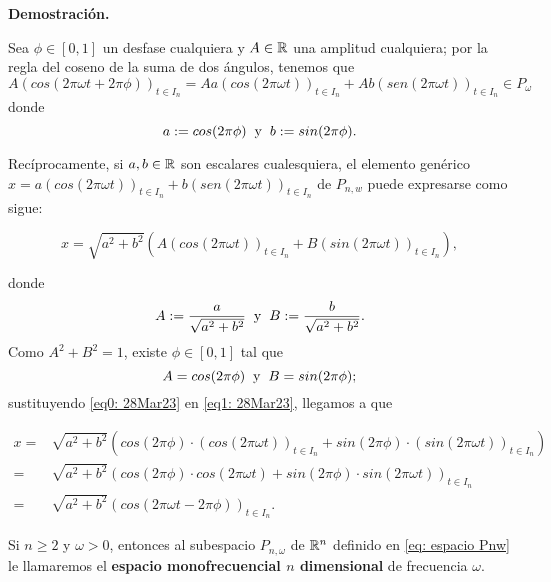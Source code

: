 \noindent
\textbf{Demostración.}

Sea $\phi \in [0,1]$ un desfase cualquiera y $A \in \mathbb{R}$
una amplitud cualquiera; por la regla
del coseno de la suma de dos ángulos, tenemos que
\[
A(cos (2 \pi \omega t + 2 \pi \phi))_{t \in I_{n}}
= Aa  (cos(2 \pi \omega t))_{t \in I_{n}} +
Ab  (sen(2 \pi \omega t))_{t \in I_{n}} \in P_{\omega} 
\]
donde
\[
a := cos (2 \pi \phi) \hspace{0.2cm} \text{y}
\hspace{0.2cm} b := sin (2 \pi  \phi).
\]


Recíprocamente, si $a, b \in \mathbb{R}$ son escalares cualesquiera, 
el elemento genérico
$x=  a \left( cos \left(2 \pi \omega t \right) \right)_{t \in I_{n}} +
b ( sen (2 \pi \omega t ))_{t \in I_{n}} $ de $P_{n,w}$ puede
expresarse como sigue:

\begin{equation}
\label{eq1: 28Mar23}
x = \sqrt{a^{2}+b^{2}} \left(
A  \left( cos \left(2 \pi \omega t \right) \right)_{t \in I_{n}} +
B  \left( sin \left(2 \pi \omega t \right) \right)_{t \in I_{n}}
\right),
\end{equation}

\noindent
donde
\[
A := \frac{a}{\sqrt{a^{2}+b^{2}}} \hspace{0.2cm} \text{y} \hspace{0.2cm}
B := \frac{b}{\sqrt{a^{2}+b^{2}}}.
\]
Como $A^{2}+ B^{2}=1$, existe $\phi \in [0,1]$ tal que
\begin{equation}
\label{eq0: 28Mar23}
A = cos (2 \pi \phi) \hspace{0.2cm} \text{y}  \hspace{0.2cm}
B = sin (2 \pi \phi);
\end{equation}
sustituyendo \eqref{eq0: 28Mar23} en \eqref{eq1: 28Mar23}, llegamos
a que

\begin{align*}
x = &  \sqrt{a^{2}+b^{2}} (
cos(2 \pi \phi) \cdot (cos (2 \pi \omega t))_{t \in I_{n}} + 
sin(2 \pi \phi) \cdot (sin (2 \pi \omega t))_{t \in I_{n}} 
) \\
= & \sqrt{a^{2}+b^{2}} (
cos(2 \pi \phi) \cdot cos (2 \pi \omega t) +
sin(2 \pi \phi) \cdot sin (2 \pi \omega t) 
)_{t \in I_{n}}  \\
= &  \sqrt{a^{2}+b^{2}} (
cos (2 \pi \omega t - 2 \pi \phi)
)_{t \in I_{n}}.
\end{align*}

\QEDB
\vspace{0.2cm}

\begin{defi}
Si $n \geq 2$ y $\omega>0$, entonces
al subespacio $P_{n,\omega}$ 
de $\mathbb{R}^{n}$
definido en \eqref{eq: espacio Pnw} 
le llamaremos el \textbf{espacio monofrecuencial
$n$ dimensional} de frecuencia $\omega$.
\end{defi}

